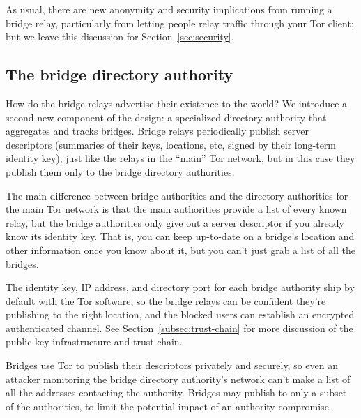 \documentclass{llncs}
\begin{document}
As usual, there are new anonymity and security implications from running a
bridge relay, particularly from letting people relay traffic through your
Tor client; but we leave this discussion for Section~\ref{sec:security}.


\subsection{The bridge directory authority}

How do the bridge relays advertise their existence to the world? We
introduce a second new component of the design: a specialized directory
authority that aggregates and tracks bridges. Bridge relays periodically
publish server descriptors (summaries of their keys, locations, etc,
signed by their long-term identity key), just like the relays in the
``main'' Tor network, but in this case they publish them only to the
bridge directory authorities.

The main difference between bridge authorities and the directory
authorities for the main Tor network is that the main authorities provide
a list of every known relay, but the bridge authorities only give
out a server descriptor if you already know its identity key. That is,
you can keep up-to-date on a bridge's location and other information
once you know about it, but you can't just grab a list of all the bridges.

The identity key, IP address, and directory port for each bridge
authority ship by default with the Tor software, so the bridge relays
can be confident they're publishing to the right location, and the
blocked users can establish an encrypted authenticated channel. See
Section~\ref{subsec:trust-chain} for more discussion of the public key
infrastructure and trust chain.

Bridges use Tor to publish their descriptors privately and securely,
so even an attacker monitoring the bridge directory authority's network
can't make a list of all the addresses contacting the authority.
Bridges may publish to only a subset of the
authorities, to limit the potential impact of an authority compromise.
\end{document}
